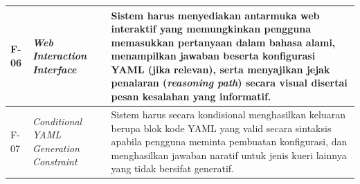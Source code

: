 \begin{longtable}{ p{} p{} p{} }
F-06 & \textit{Web Interaction Interface} &
Sistem harus menyediakan antarmuka web interaktif yang memungkinkan pengguna memasukkan pertanyaan dalam bahasa alami, menampilkan jawaban beserta konfigurasi YAML (jika relevan), serta menyajikan jejak penalaran (\textit{reasoning path}) secara visual disertai pesan kesalahan yang informatif. \\
\hline

F-07 & \textit{Conditional YAML Generation Constraint} & Sistem harus secara kondisional menghasilkan keluaran berupa blok kode YAML yang valid secara sintaksis apabila pengguna meminta pembuatan konfigurasi, dan menghasilkan jawaban naratif untuk jenis kueri lainnya yang tidak bersifat generatif. \\
\hline


\end{longtable}
